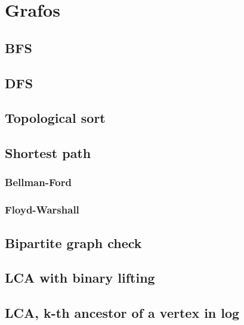 \section{Grafos}

\subsection{BFS}


\subsection{DFS}


\subsection{Topological sort}


\subsection{Shortest path}

\subsubsection{Bellman-Ford}


\subsubsection{Floyd-Warshall}


\subsection{Bipartite graph check}


\subsection{LCA with binary lifting}


\subsection{LCA, k-th ancestor of a vertex in log}


